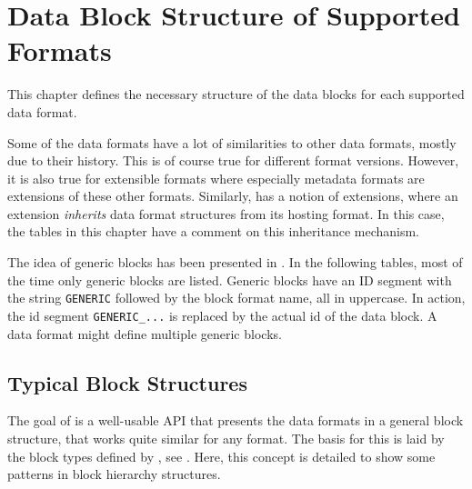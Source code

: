 
\section{Data Block Structure of Supported Formats}


This chapter defines the necessary structure of the data blocks for each supported data format.

Some of the data formats have a lot of similarities to other data formats, mostly due to their history. This is of course true for different format versions. However, it is also true for extensible formats where especially metadata formats are extensions of these other formats. Similarly, \LibName{} has a notion of extensions, where an extension \emph{inherits} data format structures from its hosting format. In this case, the tables in this chapter have a comment on this inheritance mechanism.

The idea of generic blocks has been presented in . In the following tables, most of the time only generic blocks are listed. Generic blocks have an ID segment with the string \texttt{GENERIC} followed by the block format name, all in uppercase. In action, the id segment \texttt{GENERIC_...} is replaced by the actual id of the data block. A data format might define multiple generic blocks.


\subsection{Typical Block Structures}
\label{sec:TypicalBlockStructures}

The goal of \LibName{} is a well-usable API that presents the data formats in a general block structure, that works quite similar for any format. The basis for this is laid by the block types defined by \LibName{}, see . Here, this concept is detailed to show some patterns in block hierarchy structures.



